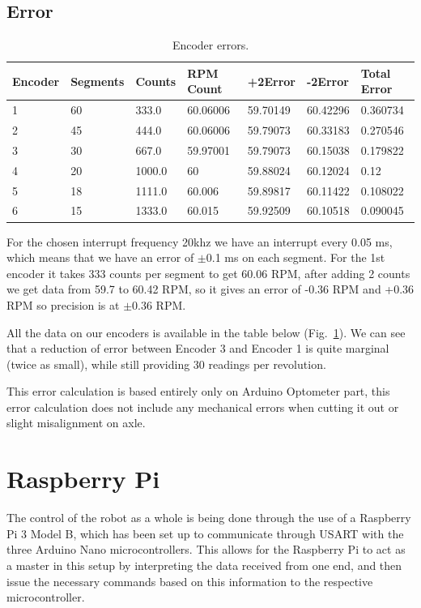 \documentclass[11pt]{article}
\begin{document}
\subsection*{Error}
\begin{table}[h]
  \centering
  \begin{tabular}{l|l|l|l|l|l|l}
  Encoder  & Segments  & Counts  & RPM Count & +2Error  & -2Error  & Total Error  \\ \hline
  1  & 60  & 333.0  & 60.06006  & 59.70149  & 60.42296  & 0.360734  \\
  2  & 45  & 444.0  & 60.06006  & 59.79073  & 60.33183  & 0.270546  \\
  3  & 30  & 667.0  & 59.97001  & 59.79073  & 60.15038  & 0.179822  \\
  4  & 20  & 1000.0  & 60  &  59.88024  & 60.12024 & 0.12\\
  5  & 18  & 1111.0  & 60.006  & 59.89817  & 60.11422  & 0.108022  \\
    6  & 15  & 1333.0  & 60.015  & 59.92509  & 60.10518  &  0.090045 \\
  \end{tabular}
  \caption{Encoder errors.}
  \label{encoder-table}
\end{table}
For the chosen interrupt frequency 20khz we have an interrupt every 0.05 ms, which means that we have an error of $\pm$0.1 ms on each segment. For the 1st encoder it takes 333 counts per segment to get 60.06 RPM, after adding 2 counts we get data from 59.7 to 60.42 RPM, so it gives an error of -0.36 RPM and +0.36 RPM so precision is at $\pm$0.36 RPM.


All the data on our encoders is available in the table below (Fig.~\ref{encoder-table}). We can see that a reduction of error between Encoder 3 and Encoder 1 is quite marginal (twice as small), while still providing 30 readings per revolution.


This error calculation is based entirely only on Arduino Optometer part, this error calculation does not include any mechanical errors when cutting it out or slight misalignment on axle.

\newpage
\section{Raspberry Pi}
The control of the robot as a whole is being done through the use of a Raspberry Pi 3 Model B, which has been set up to communicate through USART with the three Arduino Nano microcontrollers. This allows for the Raspberry Pi to act as a master in this setup by interpreting the data received from one end, and then issue the necessary commands based on this information to the respective microcontroller.
\end{document}
